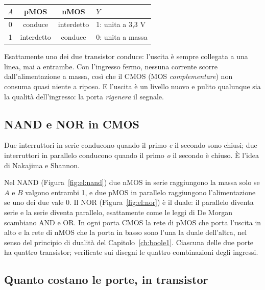 \begin{center}\small
\begin{tabular}{@{}cccl@{}}
\toprule
$A$ & \textbf{pMOS} & \textbf{nMOS} & $Y$\\
\midrule
0 & conduce & interdetto & 1: unita a 3,3 V\\
1 & interdetto & conduce & 0: unita a massa\\
\bottomrule
\end{tabular}
\end{center}

Esattamente uno dei due transistor conduce: l'uscita è sempre collegata a una
linea, mai a entrambe. Con l'ingresso fermo, nessuna corrente scorre
dall'alimentazione a massa, così che il CMOS (MOS \emph{complementare}) non
consuma quasi niente a riposo. E l'uscita è un livello nuovo e pulito
qualunque sia la qualità dell'ingresso: la porta \emph{rigenera} il segnale.

\subsection{NAND e NOR in CMOS}

\begin{prgconcept}
Due interruttori in serie conducono quando il primo \emph{e} il secondo sono
chiusi; due interruttori in parallelo conducono quando il primo \emph{o} il
secondo è chiuso. È l'idea di Nakajima e Shannon.
\end{prgconcept}

Nel NAND (Figura~\ref{fig:el:nand}) due nMOS in serie raggiungono la massa
solo se $A$ e $B$ valgono entrambi 1, e due pMOS in parallelo raggiungono
l'alimentazione se uno dei due vale 0. Il NOR (Figura~\ref{fig:el:nor}) è il
duale: il parallelo diventa serie e la serie diventa parallelo, esattamente
come le leggi di De Morgan scambiano AND e OR. In ogni porta CMOS la rete di
pMOS che porta l'uscita in alto e la rete di nMOS che la porta in basso sono
l'una la duale dell'altra, nel senso del principio di dualità del
Capitolo~\ref{ch:boole1}. Ciascuna delle due porte ha quattro transistor;
verificate sui disegni le quattro combinazioni degli ingressi.

\subsection{Quanto costano le porte, in transistor}

